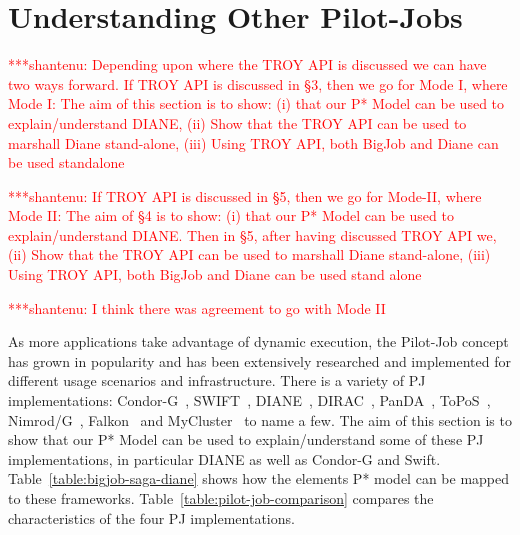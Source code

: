 \documentclass[conference,final]{IEEEtran}
\newcommand{\jhanote}[1]{ {\textcolor{red} { ***shantenu: #1 }}}
\newcommand{\jhanote}[1]{}
\begin{document}
\section{Understanding Other Pilot-Jobs}


\jhanote{Depending upon where the TROY API is discussed we can have
  two ways forward. If TROY API is discussed in \S 3, then we go for
  Mode I, where Mode I: The aim of this section is to show: (i) that
  our P* Model can be used to explain/understand DIANE, (ii) Show that
  the TROY API can be used to marshall Diane stand-alone, (iii) Using
  TROY API, both BigJob and Diane can be used standalone}

\jhanote{If TROY API is discussed in \S 5, then we go for Mode-II,
  where Mode II: The aim of \S 4 is to show: (i) that our P* Model can
  be used to explain/understand DIANE.  Then in \S 5, after having
  discussed TROY API we, (ii) Show that the TROY API can be used to
  marshall Diane stand-alone, (iii) Using TROY API, both BigJob and
  Diane can be used stand alone}

\jhanote{I think there was agreement to go with Mode II}

As more applications take advantage of dynamic execution, the Pilot-Job concept
has grown in popularity and has been extensively researched and implemented for
different usage scenarios and infrastructure. There is a variety of PJ
implementations: Condor-G~\cite{condor-g}, SWIFT~\cite{Wilde2011},
DIANE~\cite{Moscicki:908910}, DIRAC~\cite{1742-6596-219-6-062049},
PanDA~\cite{1742-6596-219-6-062041}, ToPoS~\cite{topos},
Nimrod/G~\cite{10.1109/HPC.2000.846563}, Falkon~\cite{1362680} and
MyCluster~\cite{1652061} to name a few. The aim of this section is to show that
our P* Model can be used to explain/understand some of these PJ implementations,
in particular DIANE as well as Condor-G and Swift.
Table~\ref{table:bigjob-saga-diane} shows how the elements P* model can be
mapped to these frameworks. Table~\ref{table:pilot-job-comparison} compares the
characteristics of the four PJ implementations.
\end{document}
